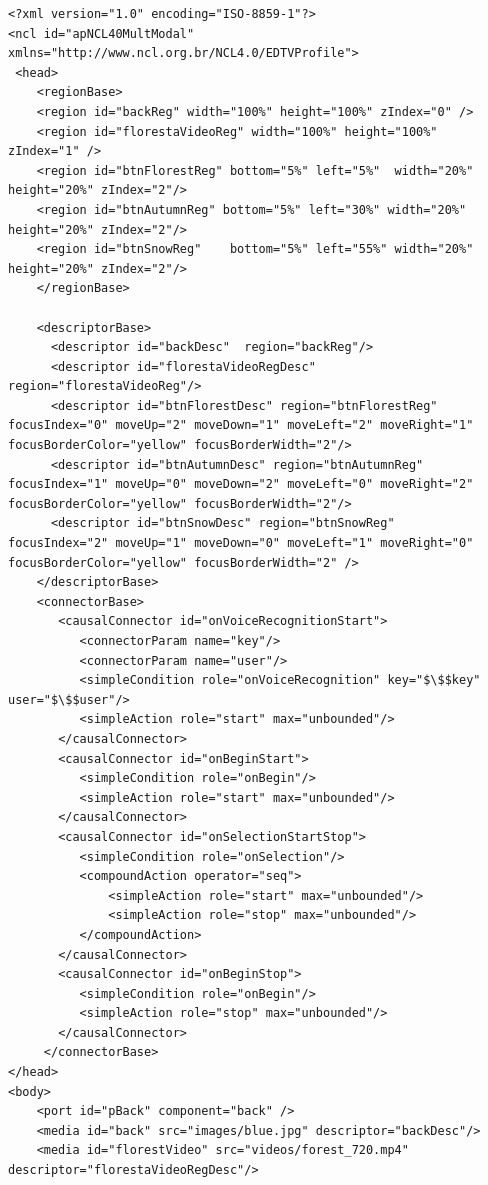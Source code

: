 \begin{lstlisting}[language=ncl,label=lst:appIntMultModal, caption={Código da aplicação NCL com interação multimodal.}]
<?xml version="1.0" encoding="ISO-8859-1"?>
<ncl id="apNCL40MultModal" xmlns="http://www.ncl.org.br/NCL4.0/EDTVProfile">
 <head>
	<regionBase>
    <region id="backReg" width="100%" height="100%" zIndex="0" />
    <region id="florestaVideoReg" width="100%" height="100%" zIndex="1" />
    <region id="btnFlorestReg" bottom="5%" left="5%"  width="20%" height="20%" zIndex="2"/>
    <region id="btnAutumnReg" bottom="5%" left="30%" width="20%" height="20%" zIndex="2"/>
    <region id="btnSnowReg"    bottom="5%" left="55%" width="20%" height="20%" zIndex="2"/>
	</regionBase>

	<descriptorBase>
      <descriptor id="backDesc"  region="backReg"/>
      <descriptor id="florestaVideoRegDesc"  region="florestaVideoReg"/>
      <descriptor id="btnFlorestDesc" region="btnFlorestReg" focusIndex="0" moveUp="2" moveDown="1" moveLeft="2" moveRight="1" focusBorderColor="yellow" focusBorderWidth="2"/>
      <descriptor id="btnAutumnDesc" region="btnAutumnReg" focusIndex="1" moveUp="0" moveDown="2" moveLeft="0" moveRight="2" focusBorderColor="yellow" focusBorderWidth="2"/>
      <descriptor id="btnSnowDesc" region="btnSnowReg"    focusIndex="2" moveUp="1" moveDown="0" moveLeft="1" moveRight="0" focusBorderColor="yellow" focusBorderWidth="2" />
	</descriptorBase>
	<connectorBase>
       <causalConnector id="onVoiceRecognitionStart">
          <connectorParam name="key"/>
          <connectorParam name="user"/>      
          <simpleCondition role="onVoiceRecognition" key="$\$$key" user="$\$$user"/>
          <simpleAction role="start" max="unbounded"/>
       </causalConnector>  
       <causalConnector id="onBeginStart">
          <simpleCondition role="onBegin"/>
          <simpleAction role="start" max="unbounded"/>
       </causalConnector>  
       <causalConnector id="onSelectionStartStop">
          <simpleCondition role="onSelection"/>
          <compoundAction operator="seq">
              <simpleAction role="start" max="unbounded"/>
              <simpleAction role="stop" max="unbounded"/>
          </compoundAction>
       </causalConnector>  
       <causalConnector id="onBeginStop">
          <simpleCondition role="onBegin"/>
          <simpleAction role="stop" max="unbounded"/>
       </causalConnector>  
	 </connectorBase>
</head>
<body>
	<port id="pBack" component="back" />
    <media id="back" src="images/blue.jpg" descriptor="backDesc"/>
    <media id="florestVideo" src="videos/forest_720.mp4" descriptor="florestaVideoRegDesc"/>

\end{lstlisting}
